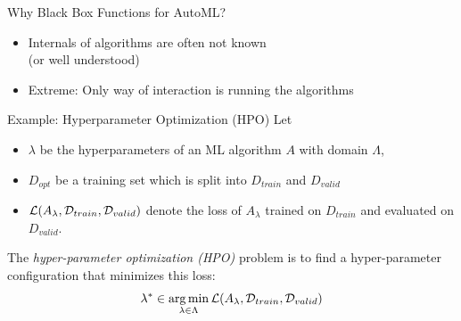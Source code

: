 \begin{frame}[c]{Why Black Box Functions for AutoML?}

\begin{itemize}
  \item Internals of algorithms are often not known\\
  (or well understood)
  \item Extreme: Only way of interaction is running the algorithms
\end{itemize}

\pause
\begin{block}{Example: Hyperparameter Optimization (HPO)}
	Let 
	\begin{itemize}
		\item $\lambda$ be the hyperparameters of an ML algorithm $A$ with domain $\Lambda$,
		\item $D_{opt}$ be a training set which is split into $D_{train}$ and $D_{valid}$ 
		\item $\mathcal{L}(A_{\mathbf{\lambda}}, \mathcal{D}_{train}, \mathcal{D}_{valid})$ denote the loss of $A_\lambda$ trained on $D_{train}$ and evaluated on $D_{valid}$.
	\end{itemize}
	The \emph{hyper-parameter optimization (HPO)} problem is to find a hyper-parameter configuration that minimizes this loss:
	\begin{equation}
	\lambda^* \in \operatorname*{arg\,min}_{\lambda \in \Lambda} \mathcal{L}(A_{\mathbf{\lambda}}, \mathcal{D}_{train}, \mathcal{D}_{valid}) \nonumber  
	\end{equation}
\end{block}

\end{frame}
